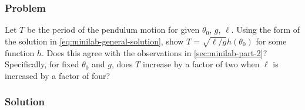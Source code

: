 \documentclass[12pt]{article}
\begin{document}
  \subsubsection*{Problem}
  Let $T$ be the period of the pendulum motion for given $\theta_0$, $g$, $\ell$.
  Using the form of the solution in \cref{eq:minilab-general-solution}, show
  $T=\sqrt{\ell/g}h(\theta_0)$ for some function $h$. Does this agree with the
  observations in \cref{sec:minilab-part-2}? Specifically, for fixed $\theta_0$
  and $g$, does $T$ increase by a factor of two when $\ell$ is increased by a
  factor of four?

  \subsubsection*{Solution}
  \todo
\end{document}
